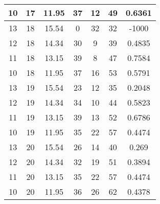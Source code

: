 \documentclass[letterpaper, 12pt]{article}
\begin{document}
\begin{longtable}{|c|c|c|c|c|c|c|}
\hline
10 & 17 & 11.95 & 37 & 12 & 49 & 0.6361 \\
\hline
13 & 18 & 15.54 & 0 & 32 & 32 & -1000 \\
\hline
12 & 18 & 14.34 & 30 & 9 & 39 & 0.4835 \\
\hline
11 & 18 & 13.15 & 39 & 8 & 47 & 0.7584 \\
\hline
10 & 18 & 11.95 & 37 & 16 & 53 & 0.5791 \\
\hline
13 & 19 & 15.54 & 23 & 12 & 35 & 0.2048 \\
\hline
12 & 19 & 14.34 & 34 & 10 & 44 & 0.5823 \\
\hline
11 & 19 & 13.15 & 39 & 13 & 52 & 0.6786 \\
\hline
10 & 19 & 11.95 & 35 & 22 & 57 & 0.4474 \\
\hline
13 & 20 & 15.54 & 26 & 14 & 40 & 0.269 \\
\hline
12 & 20 & 14.34 & 32 & 19 & 51 & 0.3894 \\
\hline
11 & 20 & 13.15 & 35 & 22 & 57 & 0.4474 \\
\hline
10 & 20 & 11.95 & 36 & 26 & 62 & 0.4378 \\
\hline
\end{longtable}
\end{document}
